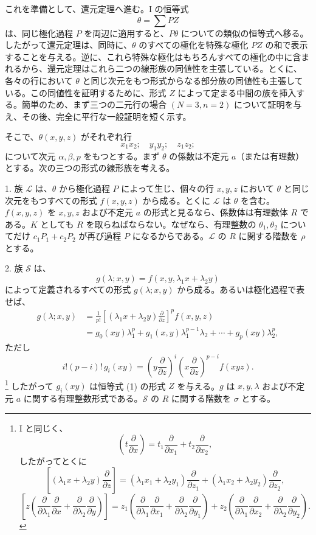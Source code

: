 これを準備として、還元定理へ進む。I の恒等式
\[
  \theta=\sum PZ
\]
は、同じ極化過程 $P$ を両辺に適用すると、$P\theta$ についての類似の恒等式へ移る。したがって還元定理は、同時に、$\theta$ のすべての極化を特殊な極化 $PZ$ の和で表示することを与える。逆に、これら特殊な極化はもちろんすべての極化の中に含まれるから、還元定理はこれら二つの線形族の同値性を主張している。とくに、各々の行において $\theta$ と同じ次元をもつ形式からなる部分族の同値性も主張している。この同値性を証明するために、形式 $Z$ によって定まる中間の族を挿入する。簡単のため、まず三つの二元行の場合 $(N=3,n=2)$ について証明を与え、その後、完全に平行な一般証明を短く示す。

そこで、$\theta(x,y,z)$ がそれぞれ行
\[
  x_1x_2;\quad y_1y_2;\quad z_1z_2;
\]
について次元 $\alpha,\beta,p$ をもつとする。まず $\theta$ の係数は不定元 $a$（または有理数）とする。次の三つの形式の線形族を考える。

1. 族 $\mathcal L$ は、$\theta$ から極化過程 $P$ によって生じ、個々の行 $x,y,z$ において $\theta$ と同じ次元をもつすべての形式 $f(x,y,z)$ から成る。とくに $\mathcal L$ は $\theta$ を含む。$f(x,y,z)$ を $x,y,z$ および不定元 $a$ の形式と見るなら、係数体は有理数体 $R$ である。$K$ としても $R$ を取らねばならない。なぜなら、有理整数の $\theta_1,\theta_2$ についてだけ $c_1P_1+c_2P_2$ が再び過程 $P$ になるからである。$\mathcal L$ の $R$ に関する階数を $\rho$ とする。

2. 族 $\mathcal S$ は、
\[
  g(\lambda;x,y)=f(x,y,\lambda_1x+\lambda_2y)
\]
によって定義されるすべての形式 $g(\lambda;x,y)$ から成る。あるいは極化過程で表せば、
\[
\begin{aligned}
  g(\lambda;x,y)
  &=\frac1{p!}\left[(\lambda_1x+\lambda_2y)\frac{\partial}{\partial z}\right]^p f(x,y,z) \\
  &=g_0(xy)\lambda_1^p+g_1(x,y)\lambda_1^{p-1}\lambda_2+\cdots+g_p(xy)\lambda_2^p,
\end{aligned}
\]
ただし
\[
  i!(p-i)!\,g_i(xy)=
  \left(y\frac{\partial}{\partial z}\right)^i
  \left(x\frac{\partial}{\partial z}\right)^{p-i}f(xyz).
\]
\footnote{I と同じく、
\[
 \left(t\frac{\partial}{\partial x}\right)=t_1\frac{\partial}{\partial x_1}+t_2\frac{\partial}{\partial x_2},
\]
したがってとくに
\[
 \left[(\lambda_1x+\lambda_2y)\frac{\partial}{\partial z}\right]
 = (\lambda_1x_1+\lambda_2y_1)\frac{\partial}{\partial z_1}
 + (\lambda_1x_2+\lambda_2y_2)\frac{\partial}{\partial z_2},
\]
\[
 \left[z\left(\frac{\partial}{\partial\lambda_1}\frac{\partial}{\partial x}
 +\frac{\partial}{\partial\lambda_2}\frac{\partial}{\partial y}\right)\right]
 =z_1\left(\frac{\partial}{\partial\lambda_1}\frac{\partial}{\partial x_1}
 +\frac{\partial}{\partial\lambda_2}\frac{\partial}{\partial y_1}\right)
 +z_2\left(\frac{\partial}{\partial\lambda_1}\frac{\partial}{\partial x_2}
 +\frac{\partial}{\partial\lambda_2}\frac{\partial}{\partial y_2}\right).
\]}
したがって $g_i(xy)$ は恒等式 (1) の形式 $Z$ を与える。$g$ は $x,y,\lambda$ および不定元 $a$ に関する有理整数形式である。$\mathcal S$ の $R$ に関する階数を $\sigma$ とする。

